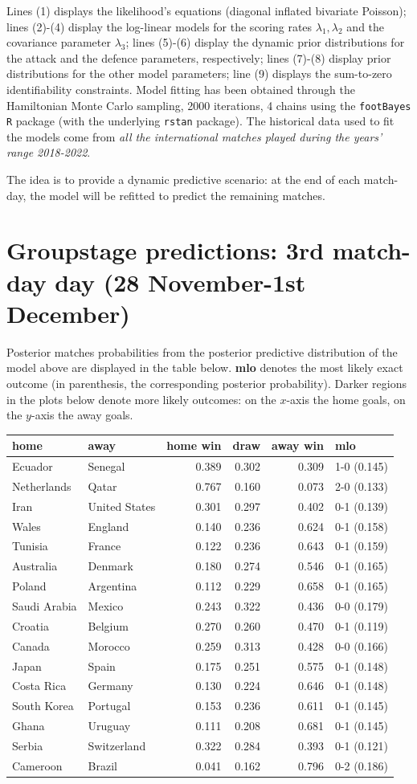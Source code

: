 \documentclass[
  10pt,
]{article}
\begin{document}
Lines (1) displays the likelihood's equations (diagonal inflated
bivariate Poisson); lines (2)-(4) display the log-linear models for the
scoring rates \(\lambda_{1}, \lambda_{2}\) and the covariance parameter
\(\lambda_3\); lines (5)-(6) display the dynamic prior distributions for
the attack and the defence parameters, respectively; lines (7)-(8)
display prior distributions for the other model parameters; line (9)
displays the sum-to-zero identifiability constraints. Model fitting has
been obtained through the Hamiltonian Monte Carlo sampling, 2000
iterations, 4 chains using the \texttt{footBayes} \texttt{R} package
(with the underlying \texttt{rstan} package). The historical data used
to fit the models come from \emph{all the international matches played
during the years' range 2018-2022}.

The idea is to provide a dynamic predictive scenario: at the end of each
match-day, the model will be refitted to predict the remaining matches.

\hypertarget{groupstage-predictions-3rd-match-day-day-28-november-1st-december}{%
\section{Groupstage predictions: 3rd match-day day (28 November-1st
December)}\label{groupstage-predictions-3rd-match-day-day-28-november-1st-december}}

Posterior matches probabilities from the posterior predictive
distribution of the model above are displayed in the table below.
\textbf{mlo} denotes the most likely exact outcome (in parenthesis, the
corresponding posterior probability). Darker regions in the plots below
denote more likely outcomes: on the \(x\)-axis the home goals, on the
\(y\)-axis the away goals.

\begin{longtable}[]{@{}llrrrl@{}}
\toprule
home & away & home win & draw & away win & mlo\tabularnewline
\midrule
\endhead
Ecuador & Senegal & 0.389 & 0.302 & 0.309 & 1-0 (0.145)\tabularnewline
Netherlands & Qatar & 0.767 & 0.160 & 0.073 & 2-0 (0.133)\tabularnewline
Iran & United States & 0.301 & 0.297 & 0.402 & 0-1
(0.139)\tabularnewline
Wales & England & 0.140 & 0.236 & 0.624 & 0-1 (0.158)\tabularnewline
Tunisia & France & 0.122 & 0.236 & 0.643 & 0-1 (0.159)\tabularnewline
Australia & Denmark & 0.180 & 0.274 & 0.546 & 0-1 (0.165)\tabularnewline
Poland & Argentina & 0.112 & 0.229 & 0.658 & 0-1 (0.165)\tabularnewline
Saudi Arabia & Mexico & 0.243 & 0.322 & 0.436 & 0-0
(0.179)\tabularnewline
Croatia & Belgium & 0.270 & 0.260 & 0.470 & 0-1 (0.119)\tabularnewline
Canada & Morocco & 0.259 & 0.313 & 0.428 & 0-0 (0.166)\tabularnewline
Japan & Spain & 0.175 & 0.251 & 0.575 & 0-1 (0.148)\tabularnewline
Costa Rica & Germany & 0.130 & 0.224 & 0.646 & 0-1
(0.148)\tabularnewline
South Korea & Portugal & 0.153 & 0.236 & 0.611 & 0-1
(0.145)\tabularnewline
Ghana & Uruguay & 0.111 & 0.208 & 0.681 & 0-1 (0.145)\tabularnewline
Serbia & Switzerland & 0.322 & 0.284 & 0.393 & 0-1
(0.121)\tabularnewline
Cameroon & Brazil & 0.041 & 0.162 & 0.796 & 0-2 (0.186)\tabularnewline
\bottomrule
\end{longtable}
\end{document}

